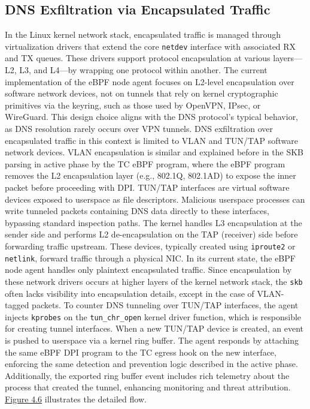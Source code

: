 \documentclass [11pt, proquest] {uwthesis}[2020/02/24]
\begin{document}
\subsection{DNS Exfiltration via Encapsulated Traffic}
In the Linux kernel network stack, encapsulated traffic is managed through virtualization drivers that extend the core \texttt{netdev} interface with associated RX and TX queues. These drivers support protocol encapsulation at various layers—L2, L3, and L4—by wrapping one protocol within another. 
The current implementation of the eBPF node agent focuses on L2-level encapsulation over software network devices, not on tunnels that rely on kernel cryptographic primitives via the keyring, such as those used by OpenVPN, IPsec, or WireGuard. This design choice aligns with the DNS protocol’s typical behavior, as DNS resolution rarely occurs over VPN tunnels. DNS exfiltration over encapsulated traffic in this context is limited to VLAN and TUN/TAP software network devices. VLAN encapsulation is similar and explained before in the SKB parsing in active phase by the TC eBPF program, where the eBPF program removes the L2 encapsulation layer (e.g., 802.1Q, 802.1AD) to expose the inner packet before proceeding with DPI.
TUN/TAP interfaces are virtual software devices exposed to userspace as file descriptors. Malicious userspace processes can write tunneled packets containing DNS data directly to these interfaces, bypassing standard inspection paths. The kernel handles L3 encapsulation at the sender side and performs L2 de-encapsulation on the TAP (receiver) side before forwarding traffic upstream. These devices, typically created using \texttt{iproute2} or \texttt{netlink}, forward traffic through a physical NIC. In its current state, the eBPF node agent handles only plaintext encapsulated traffic. Since encapsulation by these network drivers occurs at higher layers of the kernel network stack, the \texttt{skb} often lacks visibility into encapsulation details, except in the case of VLAN-tagged packets. To counter DNS tunneling over TUN/TAP interfaces, the agent injects \texttt{kprobes} on the \texttt{tun\_chr\_open} kernel driver function, which is responsible for creating tunnel interfaces. When a new TUN/TAP device is created, an event is pushed to userspace via a kernel ring buffer. The agent responds by attaching the same eBPF DPI program to the TC egress hook on the new interface, enforcing the same detection and prevention logic described in the active phase. 
Additionally, the exported ring buffer event includes rich telemetry about the process that created the tunnel, enhancing monitoring and threat attribution. \hyperref[sec:data_plane_tunnel_netdev]{Figure 4.6} illustrates the detailed flow.
\end{document}
